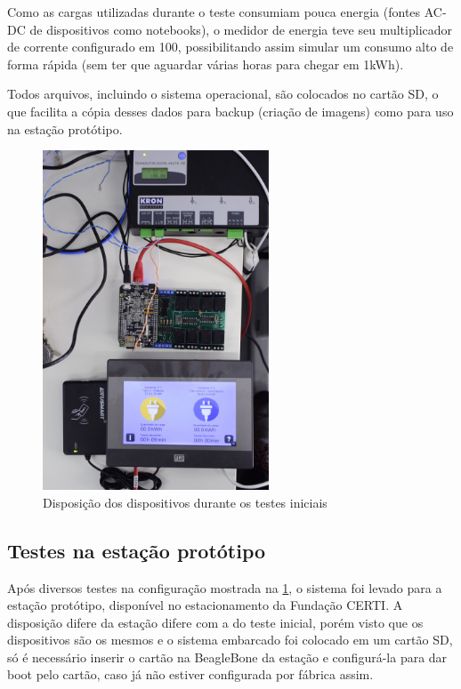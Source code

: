 Como as cargas utilizadas durante o teste consumiam pouca energia (fontes AC-DC de dispositivos como notebooks), o medidor de energia teve seu multiplicador de corrente configurado em 100, possibilitando assim simular um consumo alto de forma rápida (sem ter que aguardar várias horas para chegar em 1kWh).

Todos arquivos, incluindo o sistema operacional, são colocados no cartão SD, o que facilita a cópia desses dados para backup (criação de imagens) como para uso na estação protótipo.

\begin{figure}[H]
        \begin{center}
                \includegraphics[width=0.6\textwidth,natwidth=2130,natheight=1420,angle=-90]{assets/images/prototype-setup.jpg}
                \caption{Disposição dos dispositivos durante os testes iniciais}
                \label{fig:prototype-setup}
        \end{center}
\end{figure}

\subsection{Testes na estação protótipo}

Após diversos testes na configuração mostrada na \ref{fig:prototype-setup}, o sistema foi levado para a estação protótipo, disponível no estacionamento da Fundação CERTI. A disposição difere da estação difere com a do teste inicial, porém visto que os dispositivos são os mesmos e o sistema embarcado foi colocado em um cartão SD, só é necessário inserir o cartão na BeagleBone da estação e configurá-la para dar boot pelo cartão, caso já não estiver configurada por fábrica assim.

